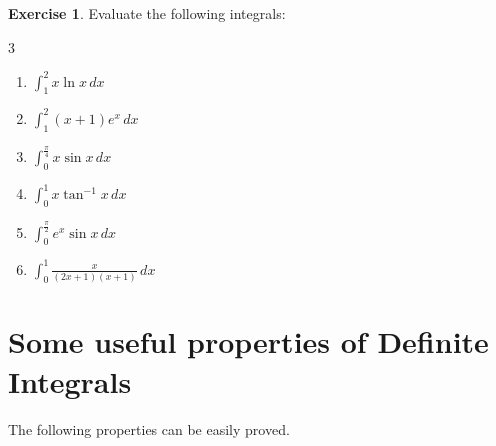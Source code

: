 \documentclass{book}
\theoremstyle{definition}
\newtheorem{exercise}{Exercise}[section]
\begin{document}
\begin{exercise}
 Evaluate the following integrals:
\begin{multicols}{3}
\begin{enumerate}[label=(\roman*)]
    \item $\displaystyle\int_1^2 x\ln x\,dx$
    \item $\displaystyle\int_1^2 (x+1)e^x\,dx$
    \item $\displaystyle\int_0^{\frac{\pi}{4}} x\sin x\,dx$
    \item $\displaystyle\int_0^1 x\tan^{-1}x\,dx$
    \item $\displaystyle\int_0^{\frac{\pi}{2}}e^x\sin x\,dx$
    \item $\displaystyle\int_0^1 \frac{x}{(2x+1)(x+1)}\,dx$

\end{enumerate}
\end{multicols}
\end{exercise}

\newpage

\section {Some useful properties of Definite Integrals}

The following properties can be easily proved.
\end{document}
